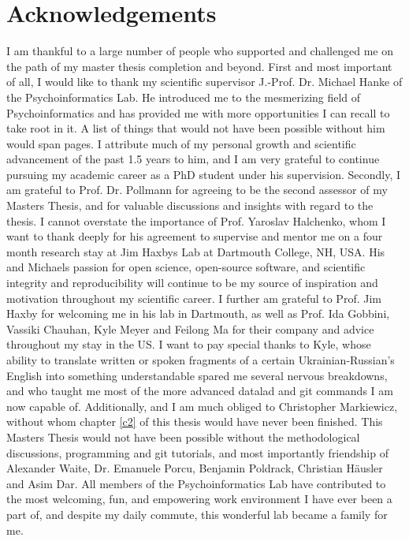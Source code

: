 \documentclass[a4paper, 12pt]{scrreprt}
\begin{document}
\clearpage



\chapter*{Acknowledgements}
{\footnotesize
I am thankful to a large number of people who supported and challenged me on the path of my master thesis completion and beyond. First and most important of all, I would like to thank my scientific supervisor J.-Prof. Dr. Michael Hanke of the Psychoinformatics Lab. He introduced me to the mesmerizing field of Psychoinformatics and has provided me with more opportunities I can recall to take root in it. A list of things that would not have been possible without him would span pages. I attribute much of my personal growth and scientific advancement of the past 1.5 years to him, and I am very grateful to continue pursuing my academic career as a PhD student under his supervision. \newline
Secondly, I am grateful to Prof. Dr. Pollmann for agreeing to be the second assessor of my Masters Thesis, and for valuable discussions and insights with regard to the thesis.\newline
I cannot overstate the importance of Prof. Yaroslav Halchenko, whom I want to thank deeply for his agreement to supervise and mentor me on a four month research stay at Jim Haxbys Lab at Dartmouth College, NH, USA. His and Michaels passion for open science, open-source software, and scientific integrity and reproducibility will continue to be my source of inspiration and motivation throughout my scientific career.\newline
I further am grateful to Prof. Jim Haxby for welcoming me in his lab in Dartmouth, as well as Prof. Ida Gobbini, Vassiki Chauhan, Kyle Meyer and Feilong Ma for their company and advice throughout my stay in the US. I want to pay special thanks to Kyle, whose ability to translate written or spoken fragments of a certain Ukrainian-Russian's English into something understandable spared me several nervous breakdowns, and who taught me most of the more advanced datalad and git commands I am now capable of. Additionally, and I am much obliged to Christopher Markiewicz, without whom chapter \ref{c2} of this thesis would have never been finished. \newline
This Masters Thesis would not have been possible without the methodological discussions, programming and git tutorials, and most importantly friendship of Alexander Waite, Dr. Emanuele Porcu, Benjamin Poldrack, Christian Häusler and Asim Dar. All members of the Psychoinformatics Lab have contributed to the most welcoming, fun, and empowering work environment I have ever been a part of, and despite my daily commute, this wonderful lab became a family for me. \newline
}
\end{document}
